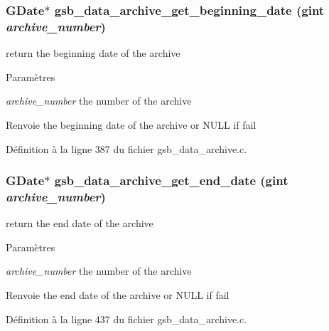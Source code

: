 \subsubsection[{gsb\_\-data\_\-archive\_\-get\_\-beginning\_\-date}]{\setlength{\rightskip}{0pt plus 5cm}GDate$\ast$ gsb\_\-data\_\-archive\_\-get\_\-beginning\_\-date (gint {\em archive\_\-number})}\label{gsb__data__archive_8c_afc0ef716ad2bcd7b9805571c6bcdc04d}
return the beginning date of the archive


\begin{DoxyParams}{Paramètres}
\item[{\em archive\_\-number}]the number of the archive\end{DoxyParams}
\begin{DoxyReturn}{Renvoie}
the beginning date of the archive or NULL if fail 
\end{DoxyReturn}


Définition à la ligne 387 du fichier gsb\_\-data\_\-archive.c.

\subsubsection[{gsb\_\-data\_\-archive\_\-get\_\-end\_\-date}]{\setlength{\rightskip}{0pt plus 5cm}GDate$\ast$ gsb\_\-data\_\-archive\_\-get\_\-end\_\-date (gint {\em archive\_\-number})}\label{gsb__data__archive_8c_acd3d52c042e9c6d8d3a42cd55c69cdd2}
return the end date of the archive


\begin{DoxyParams}{Paramètres}
\item[{\em archive\_\-number}]the number of the archive\end{DoxyParams}
\begin{DoxyReturn}{Renvoie}
the end date of the archive or NULL if fail 
\end{DoxyReturn}


Définition à la ligne 437 du fichier gsb\_\-data\_\-archive.c.

